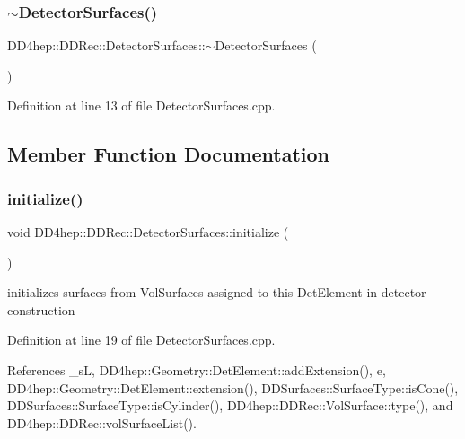 \subsubsection{\texorpdfstring{$\sim$\+Detector\+Surfaces()}{~DetectorSurfaces()}}
{\footnotesize\ttfamily D\+D4hep\+::\+D\+D\+Rec\+::\+Detector\+Surfaces\+::$\sim$\+Detector\+Surfaces (\begin{DoxyParamCaption}{ }\end{DoxyParamCaption})\hspace{0.3cm}{\ttfamily [virtual]}}



Definition at line 13 of file Detector\+Surfaces.\+cpp.



\subsection{Member Function Documentation}
\hypertarget{class_d_d4hep_1_1_d_d_rec_1_1_detector_surfaces_a7db2dd282079291d6c99275db180fd81}{}\label{class_d_d4hep_1_1_d_d_rec_1_1_detector_surfaces_a7db2dd282079291d6c99275db180fd81} 
\subsubsection{\texorpdfstring{initialize()}{initialize()}}
{\footnotesize\ttfamily void D\+D4hep\+::\+D\+D\+Rec\+::\+Detector\+Surfaces\+::initialize (\begin{DoxyParamCaption}{ }\end{DoxyParamCaption})\hspace{0.3cm}{\ttfamily [protected]}}



initializes surfaces from Vol\+Surfaces assigned to this Det\+Element in detector construction 



Definition at line 19 of file Detector\+Surfaces.\+cpp.



References \+\_\+sL, D\+D4hep\+::\+Geometry\+::\+Det\+Element\+::add\+Extension(), e, D\+D4hep\+::\+Geometry\+::\+Det\+Element\+::extension(), D\+D\+Surfaces\+::\+Surface\+Type\+::is\+Cone(), D\+D\+Surfaces\+::\+Surface\+Type\+::is\+Cylinder(), D\+D4hep\+::\+D\+D\+Rec\+::\+Vol\+Surface\+::type(), and D\+D4hep\+::\+D\+D\+Rec\+::vol\+Surface\+List().



